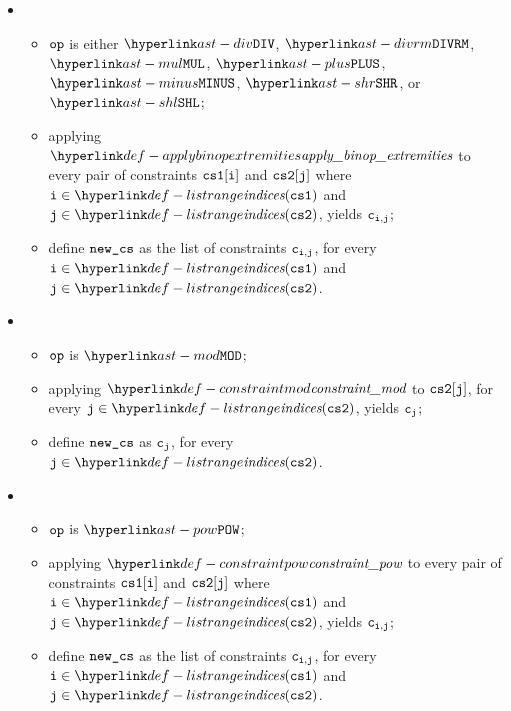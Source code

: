 \ProseParagraph
\OneApplies
\begin{itemize}
  \item {}
  \begin{itemize}
    \item $\op$ is either $\DIV$, $\DIVRM$, $\MUL$, $\PLUS$, $\MINUS$, $\SHR$, or $\SHL$;
    \item applying $\applybinopextremities$ to every pair of constraints $\csone[\vi]$ and $\cstwo[\vj]$
          where $\vi\in\listrange(\csone)$ and $\vj\in\listrange(\cstwo)$, yields $\vc_{\vi,\vj}$;
    \item define $\newcs$ as the list of constraints $\vc_{\vi,\vj}$, for every
          $\vi\in\listrange(\csone)$ and $\vj\in\listrange(\cstwo)$.
  \end{itemize}

  \item {}
  \begin{itemize}
    \item $\op$ is $\MOD$;
    \item applying $\constraintmod$ to $\cstwo[\vj]$, for every $\vj\in\listrange(\cstwo)$, yields $\vc_\vj$;
    \item define $\newcs$ as $\vc_\vj$, for every $\vj\in\listrange(\cstwo)$.
  \end{itemize}

  \item {}
  \begin{itemize}
    \item $\op$ is $\POW$;
    \item applying $\constraintpow$ to every pair of constraints $\csone[\vi]$ and $\cstwo[\vj]$
          where $\vi\in\listrange(\csone)$ and $\vj\in\listrange(\cstwo)$, yields $\vc_{\vi,\vj}$;
    \item define $\newcs$ as the list of constraints $\vc_{\vi,\vj}$, for every
          $\vi\in\listrange(\csone)$ and $\vj\in\listrange(\cstwo)$.
  \end{itemize}
\end{itemize}

\FormallyParagraph
\begin{mathpar}
\end{mathpar}

